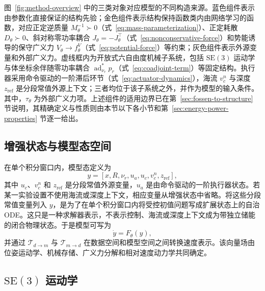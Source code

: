\documentclass[UTF8,zihao=-4]{ctexrep}
\newcommand{\SE}{\mathrm{SE}}
\newcommand{\ad}{\operatorname{ad}}
\begin{document}
图~\ref{fig:method-overview} 中的三类对象对应模型的不同构造来源。蓝色组件表示由参数化直接保证的结构先验；金色组件表示结构保持函数类内由网络学习的函数，对应正定逆质量 \(M_\theta^{-1}\succ0\)（式~\eqref{eq:mass-parameterization}）、正定耗散 \(D_\theta\succ0\)、斜对称零功率耦合 \(J_\theta=-J_\theta^\top\)（式~\eqref{eq:nonconservative-force}）和势能诱导的保守广义力 \(V_\theta\!\to\!f_\theta^{V}\)（式~\eqref{eq:potential-force}）等约束；灰色组件表示外源变量和外部广义力。虚线框内为开放式六自由度机械子系统，包括 \(\SE(3)\) 运动学与体坐标余伴随零功率耦合 \(\ad_{\nu_r}^{\ast}p_r\)（式~\eqref{eq:coadjoint-term}）等固定结构。执行器采用命令驱动的一阶滞后环节（式~\eqref{eq:actuator-dynamics}），海流 \(v_c^n\) 与深度 \(z_{\mathrm{ref}}\) 是分段常值外源上下文；三者均位于该子系统之外，并作为模型的输入条件。其中，\(\tau_\theta\) 为外部广义力项。上述组件的适用边界已在第~\ref{sec:fossen-to-structure} 节说明，其精确定义与性质则由本节以下各小节和第~\ref{sec:energy-power-properties} 节逐一给出。

\subsection{增强状态与模型态空间}

在单个积分窗口内，模型态定义为
\begin{equation}
  y
  =
  [x,R,\nu_r,u_a,u_c,v_c^n,z_{\mathrm{ref}}],
  \label{eq:augmented-model-state}
\end{equation}
其中 \(u_c\)、\(v_c^n\) 和 \(z_{\mathrm{ref}}\) 是分段常值外源变量，\(u_a\) 是由命令驱动的一阶执行器状态。若某一实验设置不使用海流或深度上下文，相应变量从增强状态中省略。将这些分段常值变量列入 \(y\)，是为了在单个积分窗口内将受控初值问题写成扩展状态上的自治 ODE。这只是一种求解器表示，不表示控制、海流或深度上下文成为带独立储能的闭合物理状态。于是模型可写为
\begin{equation}
  \dot y=F_\theta(y),
\end{equation}
并通过 \(\mathcal{T}_{d\to m}\) 与 \(\mathcal{T}_{m\to d}\) 在数据空间和模型空间之间转换速度表示。该向量场由位姿运动学、机械存储、广义力分解和相对速度动力学共同确定。

\subsection{\texorpdfstring{\(\SE(3)\)}{SE(3)} 运动学}
\end{document}
